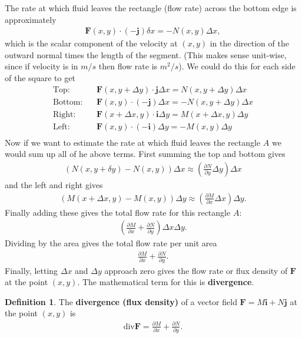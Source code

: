 \documentclass[12pt, letter]{article}
\theoremstyle{plain}
\numberwithin{theorem}{section}
\theoremstyle{definition}
\newtheorem{definition}[theorem]{Definition}
\begin{document}
The rate at which fluid leaves the rectangle (flow rate) across the bottom edge is approximately
\begin{align*}
\bm{F}(x,y)\cdot(-\bm{j})\delta x = -N(x,y)\Delta x,
\end{align*}
which is the scalar component of the velocity at $(x,y)$ in the direction of the outward normal times the length of the segment. (This makes sense unit-wise, since if velocity is in $m/s$ then flow rate is $m^2/s$). We could do this for each side of the square to get
\begin{align*}
\text{Top:} \ \ \ \ &\bm{F}(x,y+\Delta y)\cdot\bm{j}\Delta x = N(x,y+\Delta y)\Delta x\\
\text{Bottom:} \ \ \ \ &\bm{F}(x,y)\cdot(-\bm{j})\Delta x = -N(x,y+\Delta y)\Delta x\\
\text{Right:} \ \ \ \ &\bm{F}(x+\Delta x,y)\cdot\bm{i}\Delta y = M(x+\Delta x,y)\Delta y\\
\text{Left:} \ \ \ \ &\bm{F}(x,y)\cdot(-\bm{i})\Delta y = -M(x,y)\Delta y\\
\end{align*}
Now if we want to estimate the rate at which fluid leaves the rectangle $A$ we would sum up all of he above terms. First summing the top and bottom gives
\begin{align*}
(N(x,y+\delta y)-N(x,y))\Delta x \approx \left(\frac{\partial N}{\partial y} \Delta y\right)\Delta x
\end{align*}
and the left and right gives
\begin{align*}
(M(x+\Delta x,y)-M(x,y))\Delta y \approx \left(\frac{\partial M}{\partial x} \Delta x\right)\Delta y.
\end{align*}
Finally adding these gives the total flow rate for this rectangle $A$:
\begin{align*}
\left(\frac{\partial M}{\partial x}+\frac{\partial N}{\partial y}\right)\Delta x\Delta y.
\end{align*}
Dividing by the area gives the total flow rate per unit area
\begin{align*}
\frac{\partial M}{\partial x}+\frac{\partial N}{\partial y}.
\end{align*}
Finally, letting $\Delta x$ and $\Delta y$ approach zero gives the flow rate or flux density of $\bm{F}$ at the point $(x,y)$. The mathematical term for this is \textbf{divergence}.

\bigskip

\begin{definition}
The \textbf{divergence (flux density)} of a vector field $\bm{F} = M\bm{i}+N\bm{j}$ at the point $(x,y)$ is
\begin{align*}
\text{div}\bm{F}=\frac{\partial M}{\partial x}+\frac{\partial N}{\partial y}.
\end{align*}
\end{definition}
\end{document}
